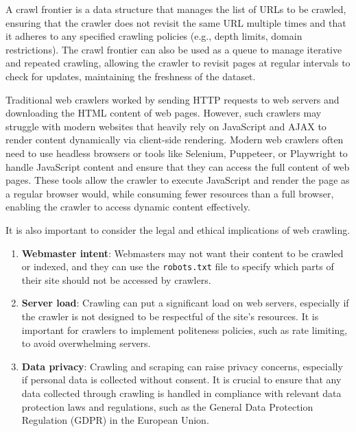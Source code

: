 A crawl frontier is a data structure that manages the list of URLs to be crawled, ensuring that the crawler does not revisit the same URL multiple times and that it adheres to any specified crawling policies (e.g., depth limits, domain restrictions).
The crawl frontier can also be used as a queue to manage iterative and repeated crawling, allowing the crawler to revisit pages at regular intervals to check for updates, maintaining the freshness of the dataset\cite{kumar2017survey}.

Traditional web crawlers worked by sending HTTP requests to web servers and downloading the HTML content of web pages.
However, such crawlers may struggle with modern websites that heavily rely on JavaScript and AJAX to render content dynamically via client-side rendering\cite{295567}.
Modern web crawlers often need to use headless browsers or tools like Selenium, Puppeteer, or Playwright to handle JavaScript content and ensure that they can access the full content of web pages\cite{mesbah2012crawling}.
These tools allow the crawler to execute JavaScript and render the page as a regular browser would, while consuming fewer resources than a full browser, enabling the crawler to access dynamic content effectively.

It is also important to consider the legal and ethical implications of web crawling.
\begin{enumerate}
    \item \textbf{Webmaster intent}: Webmasters may not want their content to be crawled or indexed, and they can use the \texttt{robots.txt} file to specify which parts of their site should not be accessed by crawlers\cite{chang2022survey}.

    \item \textbf{Server load}: Crawling can put a significant load on web servers, especially if the crawler is not designed to be respectful of the site's resources.
    It is important for crawlers to implement politeness policies, such as rate limiting, to avoid overwhelming servers\cite{kumar2017survey}.

    \item \textbf{Data privacy}: Crawling and scraping can raise privacy concerns, especially if personal data is collected without consent.
    It is crucial to ensure that any data collected through crawling is handled in compliance with relevant data protection laws and regulations, such as the General Data Protection Regulation (GDPR) in the European Union\cite{khder2021web}.
\end{enumerate}

